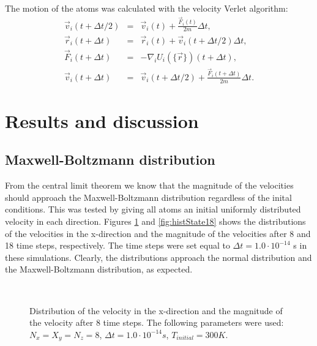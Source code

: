 \documentclass[12pt]{article}
\begin{document}
The motion of the atoms was calculated with the velocity Verlet algorithm:
\begin{eqnarray*}
\vec v_i (t + \Delta t/2) & = & \vec v_i(t) + \frac{\vec F_i(t)}{2m}\Delta t, \\
\vec r_i (t + \Delta t) & = & \vec r_i(t) + \vec v_i (t + \Delta t/2)\Delta t, \\
\vec F_i (t + \Delta t) & = & -\nabla_i U_i (\{\vec r\})(t + \Delta t), \\
\vec v_i (t + \Delta t) & = & \vec v_i (t + \Delta t/2) + \frac{\vec F_i (t + \Delta t)}{2m}\Delta t.
\end{eqnarray*}



\section{Results and discussion}

\subsection{Maxwell-Boltzmann distribution}
From the central limit theorem we know that the magnitude of the velocities should approach the Maxwell-Boltzmann distribution regardless of the inital conditions. This was tested
by giving all atoms an initial uniformly distributed velocity in each direction. Figures \ref{fig:histState8} and \ref{fig:histState18} shows the distributions of the velocities in the x-direction
and the magnitude of the velocities after 8 and 18 time steps, respectively. The time steps were set equal to $\Delta t = 1.0\cdot 10^{-14}$ s in these simulations. Clearly, the distributions approach
the normal distribution and the Maxwell-Boltzmann distribution, as expected.

\begin{figure}[!ht]
    \begin{center}
        \hspace{5mm}
        \\ 
    \end{center}
    \caption{Distribution of the velocity in the x-direction and the magnitude of the velocity after 8 time steps. The following parameters were used: $N_x = X_y = N_z = 8$,
              $\Delta t = 1.0\cdot 10^{-14} s$, $T_{initial} = 300 K$. }
    \label{fig:histState8}
\end{figure}
\end{document}
